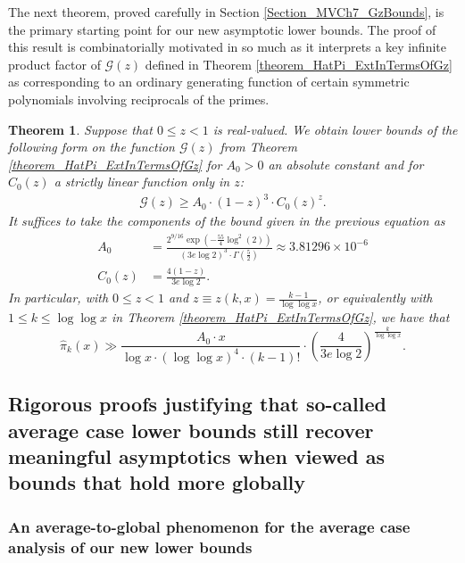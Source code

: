 \documentclass[11pt,reqno,a4letter]{article}
\numberwithin{figure}{section}
\numberwithin{table}{section}
\theoremstyle{plain}
\newtheorem{theorem}{Theorem}
\numberwithin{theorem}{section}
\theoremstyle{definition}
\newcommand{\SuccSim}[0]{\overset{_{\scriptsize{\blacktriangle}}}{\succsim}}
\renewcommand{\SuccSim}[0]{\ensuremath{\gg}}
\begin{document}
The next theorem, proved carefully in Section \ref{Section_MVCh7_GzBounds}, 
is the primary starting point for our new asymptotic lower bounds. 
The proof of this result is combinatorially motivated in so much as it interprets a key 
infinite product factor of $\mathcal{G}(z)$ defined in 
Theorem \ref{theorem_HatPi_ExtInTermsOfGz} 
as corresponding to an ordinary generating function of certain symmetric polynomials 
involving reciprocals of the primes. 

\begin{theorem} 
\label{theorem_GFs_SymmFuncs_SumsOfRecipOfPowsOfPrimes} 
\label{cor_BoundsOnGz_FromMVBook_initial_stmt_v1} 
Suppose that $0 \leq z < 1$ is real-valued. 
We obtain lower bounds of the following form on the function 
$\mathcal{G}(z)$ from Theorem \ref{theorem_HatPi_ExtInTermsOfGz} 
for $A_0 > 0$ an absolute constant and for 
$C_0(z)$ a strictly linear function only in $z$: 
\begin{align*} 
\mathcal{G}(z) \geq A_0 \cdot (1-z)^{3} \cdot C_0(z)^{z}. 
\end{align*} 
It suffices to take the components of the bound given in the previous equation as 
\begin{align*}
A_0 & = \frac{2^{9/16} \exp\left(-\frac{55}{4} \log^2(2)\right)}{ 
     (3e\log 2)^3 \cdot \Gamma\left(\frac{5}{2}\right)} \approx 3.81296 \times 10^{-6} \\ 
C_0(z) & = \frac{4(1-z)}{3e \log 2}. 
\end{align*} 
In particular, with $0 \leq z < 1$ and 
$z \equiv z(k, x) = \frac{k-1}{\log\log x}$, 
or equivalently with $1 \leq k \leq \log\log x$ in Theorem \ref{theorem_HatPi_ExtInTermsOfGz}, 
we have that 
\[
\widehat{\pi}_k(x) \SuccSim \frac{A_0 \cdot x}{\log x \cdot (\log\log x)^4 \cdot (k-1)!} \cdot 
     \left(\frac{4}{3e\log 2}\right)^{\frac{k}{\log\log x}}.
\]
\end{theorem} 

\subsection{Rigorous proofs justifying that so-called average case lower bounds still recover 
            meaningful asymptotics when viewed as bounds that hold more globally} 
\label{subSection_Intro_RigorToTheAverageCaseEstimates} 

\subsubsection{An average-to-global phenomenon for the average case analysis of our new lower bounds} 
\end{document}
